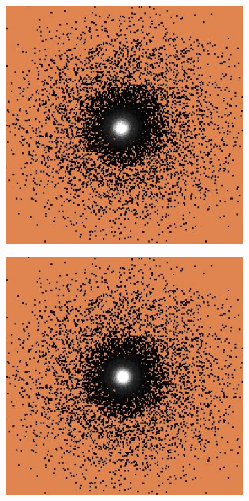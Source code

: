 \documentclass [MS] {UCLAthesis}
\begin{document}
\begin{figure}
\begin{subfigure}{0.20\textwidth}
        \caption{}
    \end{subfigure}
    \hfill
    \centering
    \begin{subfigure}{0.20\textwidth}
        \centering
        \includegraphics[width=\textwidth]{fixation4}
        \caption{}
    \end{subfigure}
    \hfill
    \centering
    \begin{subfigure}{0.20\textwidth}
        \centering
        \includegraphics[width=\textwidth]{fixation5}

\end{subfigure}
\end{figure}
\end{document}
